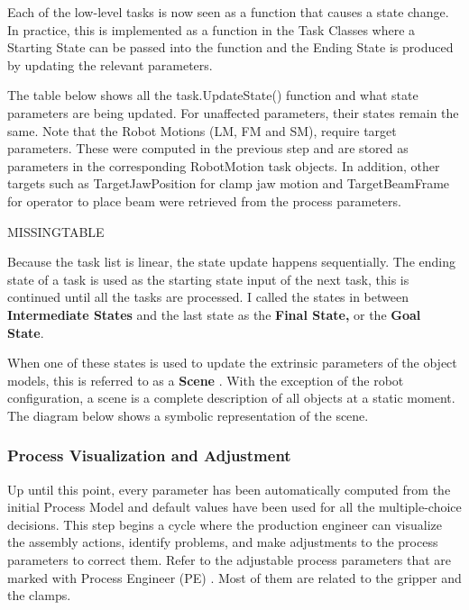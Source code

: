 Each of the low-level tasks is now seen as a function that causes a state change. In practice, this is implemented as a function in the Task Classes where a Starting State can be passed into the function and the Ending State is produced by updating the relevant parameters.



The table below shows all the task.UpdateState() function and what state parameters are being updated. For unaffected parameters, their states remain the same. Note that the Robot Motions (LM, FM and SM), require target parameters. These were computed in the previous step and are stored as parameters in the corresponding RobotMotion task objects. In addition, other targets such as TargetJawPosition for clamp jaw motion and TargetBeamFrame for operator to place beam were retrieved from the process parameters.

MISSINGTABLE

Because the task list is linear, the state update happens sequentially. The ending state of a task is used as the starting state input of the next task, this is continued until all the tasks are processed. I called the states in between \textbf{Intermediate States }and the last state as the \textbf{Final State, }or the \textbf{Goal State}.



When one of these states is used to update the extrinsic parameters of the object models, this is referred to as a \textbf{Scene} \parencite{moveit!PlanningSceneROS2023}. With the exception of the robot configuration, a scene is a complete description of all objects at a static moment. The diagram below shows a symbolic representation of the scene.




\subsubsection{Process Visualization and Adjustment}
\label{subsubsection:exploration-3-process-visualization-and-adjustment}




Up until this point, every parameter has been automatically computed from the initial Process Model and default values have been used for all the multiple-choice decisions. This step begins a cycle where the production engineer can visualize the assembly actions, identify problems, and make adjustments to the process parameters to correct them. Refer to the adjustable process parameters that are marked with Process Engineer (PE) . Most of them are related to the gripper and the clamps. 

